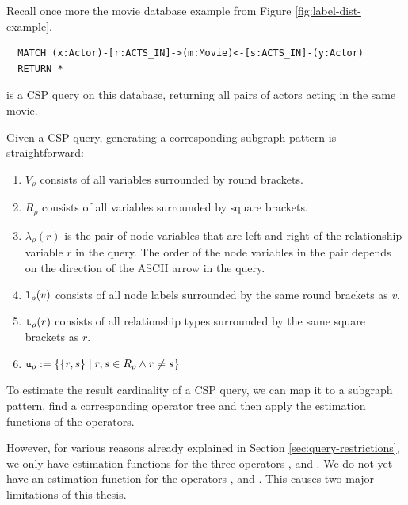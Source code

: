 \begin{example}
Recall once more the movie database example from Figure
\ref{fig:label-dist-example}.

\begin{verbatim}
  MATCH (x:Actor)-[r:ACTS_IN]->(m:Movie)<-[s:ACTS_IN]-(y:Actor)
  RETURN *
\end{verbatim}
is a CSP query on this database, returning all pairs of
actors acting in the same movie.
\end{example}

Given a CSP query, generating a corresponding subgraph pattern is
straightforward:
\begin{enumerate}
  \item $V_\rho$ consists of all variables surrounded
    by round brackets.
  \item $R_\rho$ consists of all variables surrounded
    by square brackets.
  \item $\lambda_\rho(r)$ is the pair of node variables that are
    left and right of the relationship variable $r$ in the query.
    The order of the node variables in the pair depends on the direction of
    the ASCII arrow in the query.
  \item $\texttt{l}_\rho(v)$ consists of all node labels surrounded by
    the same round brackets as $v$.
  \item $\texttt{t}_\rho(r)$ consists of all relationship types
    surrounded by the same square brackets as $r$.
  \item $\texttt{u}_\rho := \{ \{r, s\} \mid r,s \in R_\rho \land r \not = s \}$
\end{enumerate}

To estimate the result cardinality of a CSP query, we can map it to a subgraph
pattern, find a corresponding operator tree and then apply the estimation
functions of the operators.

However, for various reasons already explained in Section
\ref{sec:query-restrictions}, we only have
estimation functions for the three operators ,  and
. We do not yet have an estimation function for
the operators ,  and . This causes two major
limitations of this thesis.

